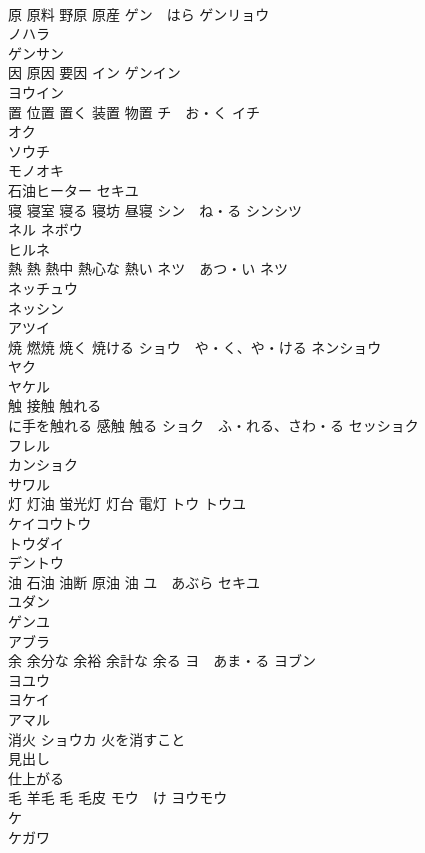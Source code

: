 \documentclass[8pt]{extreport}
\begin{document}
\begin{CJK}{UTF8}{min}
\\	原 原料 野原 原産	ゲン　はら ゲンリョウ 
\\	ノハラ 
\\	ゲンサン 
\\	因 原因 要因	イン ゲンイン 
\\	ヨウイン 
\\	置 位置 置く 装置 物置	チ　お・く イチ 
\\	オク 
\\	ソウチ 
\\	モノオキ 
\\	石油ヒーター	セキユ 
\\	寝 寝室 寝る 寝坊 昼寝	シン　ね・る シンシツ 
\\	ネル ネボウ 
\\	ヒルネ 
\\	熱 熱 熱中 熱心な 熱い	ネツ　あつ・い ネツ 
\\	ネッチュウ 
\\	ネッシン 
\\	アツイ 
\\	焼 燃焼 焼く 焼ける	ショウ　や・く、や・ける ネンショウ 
\\	ヤク 
\\	ヤケル 
\\	触 接触 触れる　
\\	に手を触れる 感触 触る	ショク　ふ・れる、さわ・る セッショク 
\\	フレル 
\\	カンショク 
\\	サワル 
\\	灯 灯油 蛍光灯 灯台 電灯	トウ トウユ 
\\	ケイコウトウ 
\\	トウダイ 
\\	デントウ 
\\	油 石油 油断 原油 油	ユ　あぶら セキユ 
\\	ユダン 
\\	ゲンユ 
\\	アブラ 
\\	余 余分な 余裕 余計な 余る	ヨ　あま・る ヨブン 
\\	ヨユウ 
\\	ヨケイ 
\\	アマル 
\\	消火	ショウカ 火を消すこと
\\	見出し	
\\	仕上がる	
\\	毛 羊毛 毛 毛皮	モウ　け ヨウモウ 
\\	ケ 
\\	ケガワ 

\end{CJK}
\end{document}
